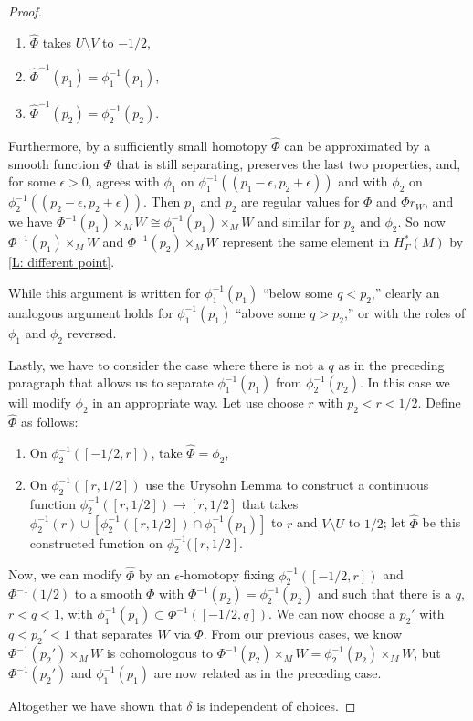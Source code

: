 \begin{proof}
\begin{enumerate}
		\item $\hat\Phi$ takes $U\setminus V$ to $-1/2$,

		\item $\hat\Phi^{-1}(p_1) = \phi_1^{-1}(p_1)$,

		\item $\hat\Phi^{-1}(p_2) = \phi_2^{-1}(p_2)$.
	\end{enumerate}
	Furthermore, by a sufficiently small homotopy $\hat\Phi$ can be approximated by a smooth function $\Phi$ that is still separating, preserves the last two properties, and, for some $\epsilon >0$, agrees with $\phi_1$ on $\phi_1^{-1}((p_1-\epsilon,p_2+\epsilon))$ and with $\phi_2$ on  $\phi_2^{-1}((p_2-\epsilon,p_2+\epsilon))$.
	Then $p_1$ and $p_2$ are regular values for $\Phi$ and $\Phi r_W$, and
	we have $\Phi^{-1}(p_1) \times_{M} W \cong \phi_1^{-1}(p_1) \times_{M} W$ and similar for $p_2$ and $\phi_2$.
	So now  $\Phi^{-1}(p_1) \times_{M} W$ and  $\Phi^{-1}(p_2) \times_{M} W$ represent the same element in $H^*_\Gamma(M)$ by \cref{L: different point}.

	While this argument is written for $\phi_1^{-1}(p_1)$ ``below some $q<p_2$,'' clearly an analogous argument holds for $\phi_1^{-1}(p_1)$ ``above some $q>p_2$,'' or with the roles of $\phi_1$ and $\phi_2$ reversed.

	Lastly, we have to consider the case where there is not a $q$ as in the preceding paragraph that allows us to separate $\phi_1^{-1}(p_1)$ from $\phi_2^{-1}(p_2)$.
	In this case we will modify $\phi_2$ in an appropriate way.
	Let use choose $r$ with $p_2 <r<1/2$.
	Define $\hat \Phi$ as follows:

	\begin{enumerate}
		\item On $\phi_2^{-1}([-1/2,r])$, take $\hat \Phi = \phi_2$,

		\item On $\phi_2^{-1}([r,1/2])$ use the Urysohn Lemma to construct a continuous function $\phi_2^{-1}([r,1/2]) \to [r,1/2]$ that takes $\phi_2^{-1}(r) \cup [\phi_2^{-1}([r,1/2]) \cap \phi_1^{-1}(p_1)]$ to $r$ and $V\setminus U$ to $1/2$; let $\hat \Phi$ be this constructed function on $\phi_2^{-1}([r,1/2]$.
	\end{enumerate}

	Now, we can modify $\hat \Phi$ by an $\epsilon$-homotopy fixing $\phi_2^{-1}([-1/2,r])$ and $\Phi^{-1}(1/2)$ to a smooth $\Phi$ with $\Phi^{-1}(p_2) = \phi_2^{-1}(p_2)$ and such that there is a $q$, $r<q<1$, with $\phi_1^{-1}(p_1) \subset \Phi^{-1}([-1/2,q])$.
	We can now choose a $p_2'$ with $q<p_2'<1$ that separates $W$ via $\Phi$.
	From our previous cases, we know $\Phi^{-1}(p_2')\times_{M}W$ is cohomologous to $\Phi^{-1}(p_2)\times_{M}W = \phi_2^{-1}(p_2)\times_{M}W$, but $\Phi^{-1}(p_2')$ and $\phi_1^{-1}(p_1)$ are now related as in the preceding case.

	Altogether we have shown that $\delta$ is independent of choices.
\end{proof}


